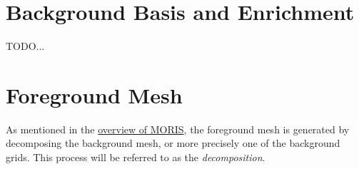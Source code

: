 \section{Background Basis and Enrichment}
\label{sec:overview_background}

TODO...

\section{Foreground Mesh}
\label{sec:overview_foreground}

As mentioned in the \hyperlink{moris_overview}{overview of MORIS}, the foreground mesh is generated by decomposing the background mesh, or more precisely one of the background grids. This process will be referred to as the \emph{decomposition}.

